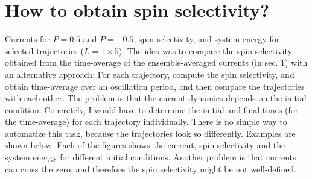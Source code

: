 \documentclass{article}
\begin{document}
\section{How to obtain spin selectivity?}
Currents for $P=0.5$ and $P=-0.5$, spin selectivity, and system energy for selected trajectories ($L=1\times 5$). The idea was to compare the spin selectivity obtained from the time-average of the ensemble-averaged currents (in sec. 1) with an alternative approach: For each trajectory, compute the spin selectivity, and obtain time-average over an oscillation period, and then compare the trajectories with each other. The problem is that the current dynamics depends on the initial condition. Concretely, I would have to determine the initial and final times (for the time-average) for each trajectory individually. There is no simple way to automatize this task, because the trajectories look so differently. Examples are shown below. Each of the figures shows the current, spin selectivity and the system energy for different initial conditions. Another problem is that currents can cross the zero, and therefore the spin selectivity might be not well-defined.
\clearpage
\end{document}
